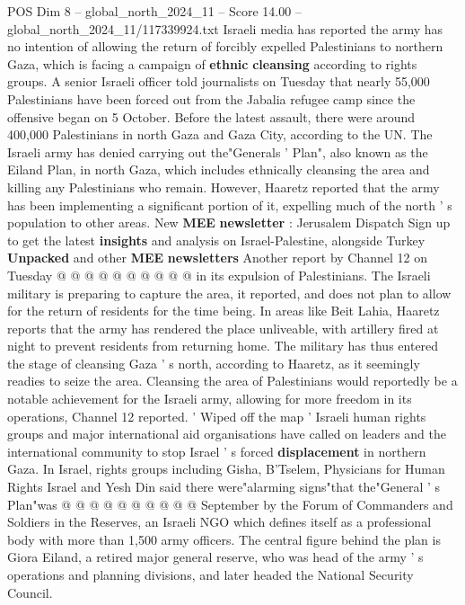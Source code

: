 \begin{textsample}{POS Dim 8 – global\_north\_2024\_11 – Score 14.00 – global\_north\_2024\_11/117339924.txt}  \label{ex:f8_pos_052}
Israeli media has reported the army has no intention of allowing the return of forcibly expelled Palestinians to northern Gaza, which is facing a campaign of \textbf{ethnic} \textbf{cleansing} according to rights groups.
A senior Israeli officer told journalists on Tuesday that nearly 55,000 Palestinians have been forced out from the Jabalia refugee camp since the offensive began on 5 October.
Before the latest assault, there were around 400,000 Palestinians in north Gaza and Gaza City, according to the UN.
The Israeli army has denied carrying out the"Generals ' Plan", also known as the Eiland Plan, in north Gaza, which includes ethnically cleansing the area and killing any Palestinians who remain.
However, Haaretz reported that the army has been implementing a significant portion of it, expelling much of the north ' s population to other areas.
New \textbf{MEE} \textbf{newsletter} : Jerusalem Dispatch Sign up to get the latest \textbf{insights} and analysis on Israel-Palestine, alongside Turkey \textbf{Unpacked} and other \textbf{MEE} \textbf{newsletters} Another report by Channel 12 on Tuesday @ @ @ @ @ @ @ @ @ @ in its expulsion of Palestinians.
The Israeli military is preparing to capture the area, it reported, and does not plan to allow for the return of residents for the time being.
In areas like Beit Lahia, Haaretz reports that the army has rendered the place unliveable, with artillery fired at night to prevent residents from returning home.
The military has thus entered the stage of cleansing Gaza ' s north, according to Haaretz, as it seemingly readies to seize the area.
Cleansing the area of Palestinians would reportedly be a notable achievement for the Israeli army, allowing for more freedom in its operations, Channel 12 reported. ' Wiped off the map ' Israeli human rights groups and major international aid organisations have called on leaders and the international community to stop Israel ' s forced \textbf{displacement} in northern Gaza.
In Israel, rights groups including Gisha, B'Tselem, Physicians for Human Rights Israel and Yesh Din said there were"alarming signs"that the"General ' s Plan"was @ @ @ @ @ @ @ @ @ @ September by the Forum of Commanders and Soldiers in the Reserves, an Israeli NGO which defines itself as a professional body with more than 1,500 army officers.
The central figure behind the plan is Giora Eiland, a retired major general reserve, who was head of the army ' s operations and planning divisions, and later headed the National Security Council.

\end{textsample}
